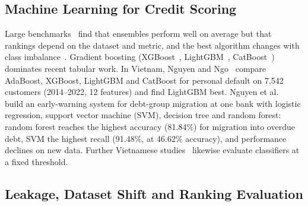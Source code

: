 \documentclass[runningheads]{llncs}
\begin{document}
\subsection{Machine Learning for Credit Scoring}

Large benchmarks~\cite{baesens2003benchmarking,lessmann2015benchmarking} find that ensembles perform well on average but that rankings depend on the dataset and metric, and the best algorithm changes with class imbalance~\cite{brown2012experimental}. Gradient boosting (XGBoost~\cite{chen2016xgboost}, LightGBM~\cite{ke2017lightgbm}, CatBoost~\cite{prokhorenkova2018catboost}) dominates recent tabular work. In Vietnam, Nguyen and Ngo~\cite{nguyen2025boosting} compare AdaBoost, XGBoost, LightGBM and CatBoost for personal default on 7,542 customers (2014--2022, 12 features) and find LightGBM best. Nguyen et al.~\cite{nguyen2024ews} build an early-warning system for debt-group migration at one bank with logistic regression, support vector machine (SVM), decision tree and random forest: random forest reaches the highest accuracy (81.84\%) for migration into overdue debt, SVM the highest recall (91.48\%, at 46.62\% accuracy), and performance declines on new data. Further Vietnamese studies~\cite{tran2021mlcredit,trung2024credit} likewise evaluate classifiers at a fixed threshold.

\subsection{Leakage, Dataset Shift and Ranking Evaluation}
\end{document}
